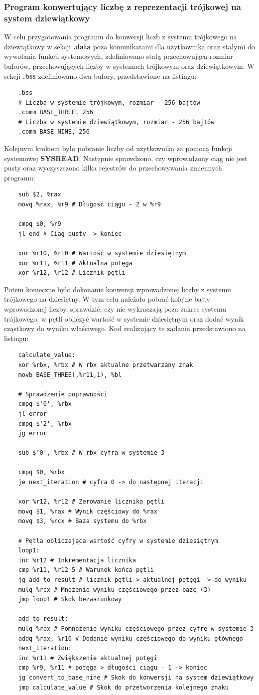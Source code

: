 \documentclass[a4paper,12pt]{article}
\begin{document}
\subsubsection{Program konwertujący liczbę z reprezentacji trójkowej na system dziewiątkowy}
W celu przygotowania programu do konwersji liczb z systemu trójkowego na dziewiątkowy w sekcji \textbf{.data} poza komunikatami dla użytkownika oraz stałymi do wywołania funkcji systemowych, zdefiniowano stałą przechowującą rozmiar buforów, przechowujących liczby w systemach trójkowym oraz dziewiątkowym. W sekcji \textbf{.bss} zdefiniowano dwa bufory, przedstawione na listingu:
\begin{verbatim}
	.bss
	# Liczba w systemie trójkowym, rozmiar - 256 bajtów
	.comm BASE_THREE, 256
	# Liczba w systemie dziewiątkowym, rozmiar - 256 bajtów 
	.comm BASE_NINE, 256
\end{verbatim}
Kolejnym krokiem było pobranie liczby od użytkownika za pomocą funkcji systemowej \textbf{SYSREAD}. Następnie sprawdzono, czy wprowadzony ciąg nie jest pusty oraz wyczyszczono kilka rejestrów do przechowywania zmiennych programu:
\begin{verbatim}
	sub $2, %rax 
	movq %rax, %r9 # Długość ciągu - 2 w %r9
	
	cmpq $0, %r9
	jl end # Ciąg pusty -> koniec
	
	xor %r10, %r10 # Wartość w systemie dziesiętnym
	xor %r11, %r11 # Aktualna potęga
	xor %r12, %r12 # Licznik pętli
\end{verbatim} 
Potem konieczne było dokonanie konwersji wprowadzonej liczby z systemu trójkowego na dziesiętny. W tym celu należało pobrać kolejne bajty wprowadzonej liczby, sprawdzić, czy nie wykraczają poza zakres systemu trójkowego, w pętli obliczyć wartość w systemie dziesiętnym oraz dodać wynik cząstkowy do wyniku właściwego. Kod realizujący te zadania przedstawiono na listingu:
\begin{verbatim}
	calculate_value:
	xor %rbx, %rbx # W rbx aktualne przetwarzany znak
	movb BASE_THREE(,%r11,1), %bl
	
	# Sprawdzenie poprawności
	cmpq $'0', %rbx
	jl error 
	cmpq $'2', %rbx
	jg error
	
	sub $'0', %rbx # W rbx cyfra w systemie 3
	
	cmpq $0, %rbx
	je next_iteration # cyfra 0 -> do następnej iteracji
	
	xor %r12, %r12 # Zerowanie licznika pętli
	movq $1, %rax # Wynik częściowy do %rax
	movq $3, %rcx # Baza systemu do %rbx
	
	# Pętla obliczająca wartość cyfry w systemie dziesiętnym
	loop1:
	inc %r12 # Inkrementacja licznika
	cmp %r11, %r12 5 # Warunek końca pętli
	jg add_to_result # licznik pętli > aktualnej potęgi -> do wyniku
	mulq %rcx # Mnożenie wyniku częściowego przez bazę (3)
	jmp loop1 # Skok bezwarunkowy
	
	add_to_result:
	mulq %rbx # Pomnożenie wyniku częściowego przez cyfrę w systemie 3
	addq %rax, %r10 # Dodanie wyniku częściowego do wyniku głównego
	next_iteration:
	inc %r11 # Zwiększenie aktualnej potęgi
	cmp %r9, %r11 # potęga > długości ciągu - 1 -> koniec
	jg convert_to_base_nine # Skok do konwersji na system dziewiątkowy
	jmp calculate_value # Skok do przetworzenia kolejnego znaku
\end{verbatim}
\end{document}
